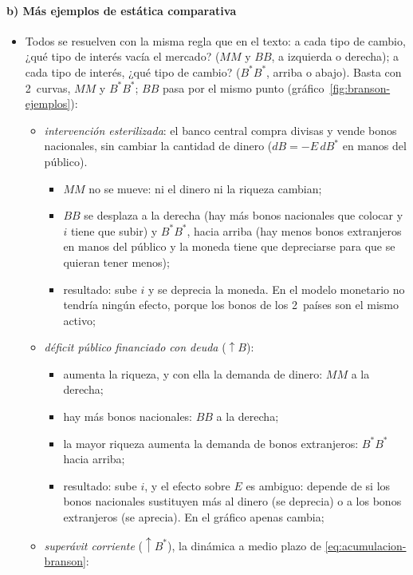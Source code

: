 \documentclass[11pt]{article}
\begin{document}
\paragraph{b) Más ejemplos de estática comparativa}
\begin{itemize}
\item Todos se resuelven con la misma regla que en el texto: a cada tipo de cambio, ¿qué tipo de interés vacía el mercado? ($MM$ y $BB$, a izquierda o derecha); a cada tipo de interés, ¿qué tipo de cambio? ($B^*B^*$, arriba o abajo). Basta con 2~curvas, $MM$ y $B^*B^*$; $BB$ pasa por el mismo punto (gráfico~\ref{fig:branson-ejemplos}):
  \begin{itemize}
  \item \emph{intervención esterilizada}: el banco central compra divisas y vende bonos nacionales, sin cambiar la cantidad de dinero ($dB=-E\,dB^*$ en manos del público).
    \begin{itemize}
    \item $MM$ no se mueve: ni el dinero ni la riqueza cambian;
    \item $BB$ se desplaza a la derecha (hay más bonos nacionales que colocar y $i$ tiene que subir) y $B^*B^*$, hacia arriba (hay menos bonos extranjeros en manos del público y la moneda tiene que depreciarse para que se quieran tener menos);
    \item resultado: sube $i$ y se deprecia la moneda. En el modelo monetario no tendría ningún efecto, porque los bonos de los 2~países son el mismo activo;
    \end{itemize}
  \item \emph{déficit público financiado con deuda} ($\uparrow B$):
    \begin{itemize}
    \item aumenta la riqueza, y con ella la demanda de dinero: $MM$ a la derecha;
    \item hay más bonos nacionales: $BB$ a la derecha;
    \item la mayor riqueza aumenta la demanda de bonos extranjeros: $B^*B^*$ hacia arriba;
    \item resultado: sube $i$, y el efecto sobre $E$ es ambiguo: depende de si los bonos nacionales sustituyen más al dinero (se deprecia) o a los bonos extranjeros (se aprecia). En el gráfico apenas cambia;
    \end{itemize}
  \item \emph{superávit corriente} ($\uparrow B^*$), la dinámica a medio plazo de \eqref{eq:acumulacion-branson}:
    \begin{itemize}

\end{itemize}
\end{itemize}
\end{itemize}
\end{document}
